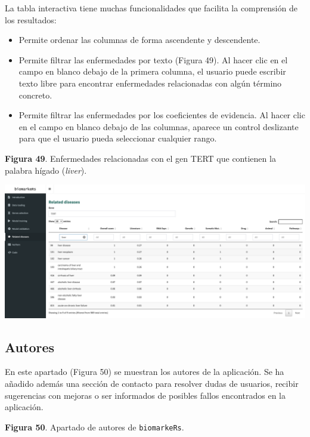 La tabla interactiva tiene muchas funcionalidades que facilita la comprensión de los resultados:
\begin{itemize}
	\item Permite ordenar las columnas de forma ascendente y descendente.
	\item Permite filtrar las enfermedades por texto (Figura 49).  Al hacer clic en el campo en blanco debajo de la primera columna, el usuario puede escribir texto libre para encontrar enfermedades relacionadas con algún término concreto.
	\item Permite filtrar las enfermedades por los coeficientes de evidencia. Al hacer clic en el campo en blanco debajo de las columnas, aparece un control deslizante para que el usuario pueda seleccionar cualquier rango.
\end{itemize}

\begin{center}
	\textbf{Figura 49}. Enfermedades relacionadas con el gen TERT que contienen la palabra hígado (\textit{liver}).
\end{center}

\begin{center}
	\includegraphics[width=.90\textwidth]{figuras/49_related_diseases_filtered.png} \\
\end{center}

\subsection{Autores}

En este apartado (Figura 50) se muestran los autores de la aplicación. Se ha añadido además una sección de contacto para resolver dudas de usuarios, recibir sugerencias con mejoras o ser informados de posibles fallos encontrados en la aplicación.

\begin{center}
	\textbf{Figura 50}. Apartado de autores de \texttt{biomarkeRs}.
\end{center}

